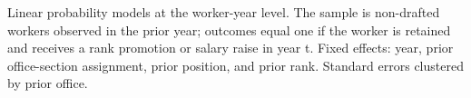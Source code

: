 \par \raggedright 
Linear probability models at the worker-year level. The sample is non-drafted workers observed in the prior year; outcomes equal one if the worker is retained and receives a rank promotion or salary raise in year t. Fixed effects: year, prior office-section assignment, prior position, and prior rank. Standard errors clustered by prior office.
\par\endgroup


